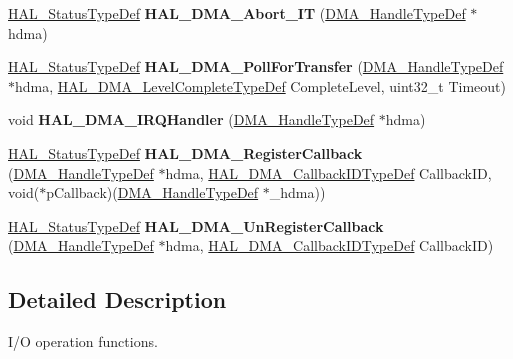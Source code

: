 \begin{DoxyCompactItemize}
\mbox{\hyperlink{stm32f7xx__hal__def_8h_a63c0679d1cb8b8c684fbb0632743478f}{H\+A\+L\+\_\+\+Status\+Type\+Def}} {\bfseries H\+A\+L\+\_\+\+D\+M\+A\+\_\+\+Abort\+\_\+\+IT} (\mbox{\hyperlink{group___d_m_a___exported___types_ga41b754a906b86bce54dc79938970138b}{D\+M\+A\+\_\+\+Handle\+Type\+Def}} $\ast$hdma)
\item 
\mbox{\label{group___d_m_a___exported___functions___group2_ga976a30472df973e3ad983f21289c9b5d}} 
\mbox{\hyperlink{stm32f7xx__hal__def_8h_a63c0679d1cb8b8c684fbb0632743478f}{H\+A\+L\+\_\+\+Status\+Type\+Def}} {\bfseries H\+A\+L\+\_\+\+D\+M\+A\+\_\+\+Poll\+For\+Transfer} (\mbox{\hyperlink{group___d_m_a___exported___types_ga41b754a906b86bce54dc79938970138b}{D\+M\+A\+\_\+\+Handle\+Type\+Def}} $\ast$hdma, \mbox{\hyperlink{group___d_m_a___exported___types_gaee3245eea8fa938edeb35a6c9596fd86}{H\+A\+L\+\_\+\+D\+M\+A\+\_\+\+Level\+Complete\+Type\+Def}} Complete\+Level, uint32\+\_\+t Timeout)
\item 
\mbox{\label{group___d_m_a___exported___functions___group2_ga8c8564d06f6d39b702af1c5cbb7dd54a}} 
void {\bfseries H\+A\+L\+\_\+\+D\+M\+A\+\_\+\+I\+R\+Q\+Handler} (\mbox{\hyperlink{group___d_m_a___exported___types_ga41b754a906b86bce54dc79938970138b}{D\+M\+A\+\_\+\+Handle\+Type\+Def}} $\ast$hdma)
\item 
\mbox{\label{group___d_m_a___exported___functions___group2_gaabec77de08a59c94f2c6265ce7ae8261}} 
\mbox{\hyperlink{stm32f7xx__hal__def_8h_a63c0679d1cb8b8c684fbb0632743478f}{H\+A\+L\+\_\+\+Status\+Type\+Def}} {\bfseries H\+A\+L\+\_\+\+D\+M\+A\+\_\+\+Register\+Callback} (\mbox{\hyperlink{group___d_m_a___exported___types_ga41b754a906b86bce54dc79938970138b}{D\+M\+A\+\_\+\+Handle\+Type\+Def}} $\ast$hdma, \mbox{\hyperlink{group___d_m_a___exported___types_gafbe8b2bd9ce2128de6cdc08ccde7e8ad}{H\+A\+L\+\_\+\+D\+M\+A\+\_\+\+Callback\+I\+D\+Type\+Def}} Callback\+ID, void($\ast$p\+Callback)(\mbox{\hyperlink{group___d_m_a___exported___types_ga41b754a906b86bce54dc79938970138b}{D\+M\+A\+\_\+\+Handle\+Type\+Def}} $\ast$\+\_\+hdma))
\item 
\mbox{\label{group___d_m_a___exported___functions___group2_ga87842d3780f0e54c7fb29a003e6b5ac4}} 
\mbox{\hyperlink{stm32f7xx__hal__def_8h_a63c0679d1cb8b8c684fbb0632743478f}{H\+A\+L\+\_\+\+Status\+Type\+Def}} {\bfseries H\+A\+L\+\_\+\+D\+M\+A\+\_\+\+Un\+Register\+Callback} (\mbox{\hyperlink{group___d_m_a___exported___types_ga41b754a906b86bce54dc79938970138b}{D\+M\+A\+\_\+\+Handle\+Type\+Def}} $\ast$hdma, \mbox{\hyperlink{group___d_m_a___exported___types_gafbe8b2bd9ce2128de6cdc08ccde7e8ad}{H\+A\+L\+\_\+\+D\+M\+A\+\_\+\+Callback\+I\+D\+Type\+Def}} Callback\+ID)
\end{DoxyCompactItemize}


\subsection{Detailed Description}
I/O operation functions. 

